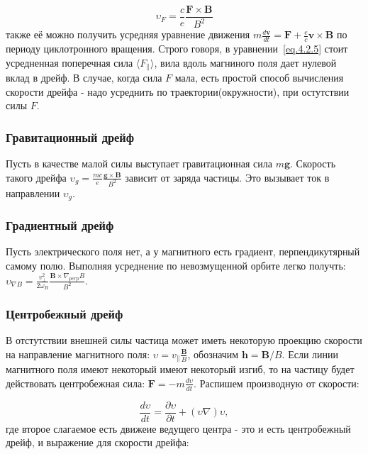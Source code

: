 \documentclass[10pt, a4paper]{article}
\numberwithin{equation}{section}
\begin{document}
\begin{equation}
    \label{eq.4.2.5}
    \upsilon_F=\frac{c}{e} \frac{\mathbf{F} \times \mathbf{B}}{B^2}
\end{equation}
также её можно получить усредняя уравнение движения $m\frac{d\mathbf{v}}{dt}=\mathbf{F} + \frac{e}{c} \mathbf{v}\times\mathbf{B}$
по периоду циклотронного вращения. Строго говоря, в уравнении~\ref{eq.4.2.5} стоит усредненная поперечная сила 
$\langle F_{\parallel} \rangle$, вила вдоль магниного поля дает нулевой вклад в дрейф. В случае, когда сила $F$ мала, есть
простой способ вычисления скорости дрейфа - надо усреднить по траектории(окружности), при остутствии силы $F$.

\subsubsection{Гравитационный дрейф}
\label{sec.4.2.3}

Пусть в качестве малой силы выступает гравитационная сила $m\mathbf{g}$. Скорость такого дрейфа 
$\upsilon_g=\frac{mc}{e} \frac{\mathbf{g}\times\mathbf{B}}{B^2}$ зависит от заряда частицы. Это вызывает ток в направлении $\upsilon_g$.

\subsubsection{Градиентный дрейф}
\label{sec.4.2.4}

Пусть электрического поля нет, а у магнитного есть градиент, перпендикутярный самому полю. Выполняя усреднение по
невозмущенной орбите легко получть: $\upsilon_{\nabla B}=\frac{v_{\perp}^2}{2\omega_B} \frac{\mathbf{B}\times\nabla_{perp}B }{B^2}$.

\subsubsection{Центробежный дрейф}
\label{sec.4.2.5}
В отстутствии внешней силы частица может иметь некоторую проекцию скорости на направление магнитного поля:
$\upsilon=v_{\parallel}  \frac{\mathbf{B}}{B}$, обозначим $\mathbf{h}= \mathbf{B}/B$. Если линии магнитного поля имеют некоторый
имеют некоторый изгиб, то на частицу будет действовать центробежная сила: $\mathbf{F}=-m\frac{d\upsilon}{dt}$. Распишем
производную от скорости:

\begin{equation}
    \label{eq.4.2.5-u}
    \frac{d\upsilon}{dt}=\frac{\partial \upsilon}{\partial t} + (\upsilon \nabla) \upsilon,
\end{equation}
где второе слагаемое есть движеие ведущего центра - это и есть центробежный дрейф, и выражение для скорости дрейфа:
\end{document}
